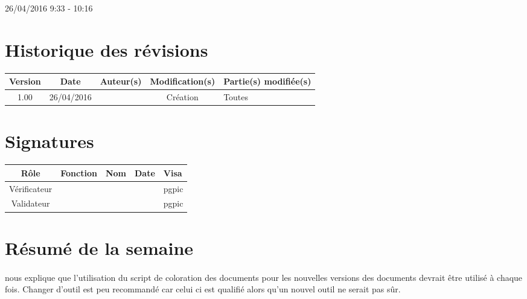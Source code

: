 \documentclass [a4paper] {article}
\begin{document}
\rhead{}

26/04/2016
\hfill   
\hfill 	9:33 - 10:16 				%



\section*{Historique des révisions}
\begin{center}
			\begin{tabular}{| c | c | c | c | p{4cm} |}
				\hline
				\rowcolor{Gray}
				Version & Date & Auteur(s) & Modification(s) & Partie(s) modifiée(s)		 \\
				\hline
				1.00 & 26/04/2016 & \Pierre & Création & Toutes \\
		\hline		
			\end{tabular}
		\end{center}

\section*{Signatures}

		\begin{center}
			\begin{tabular}{| c | c | c | c | p{4cm} |}
				\hline
				\rowcolor{Gray}
				Rôle & Fonction & Nom & Date & Visa		 \\
				\hline
				Vérificateur & \RQA & \Kafui &  & pgpic \\[30pt]
				\hline
				Validateur & \CP & \Sergi &  & pgpic \\[30pt]	
				\hline
			\end{tabular}
		\end{center}


\section{Résumé de la semaine}
\paragraph*{}
\nomTuteurQualite{} nous explique que l'utilisation du script de coloration des documents pour les nouvelles versions des documents devrait être utilisé à chaque fois. Changer d'outil est peu recommandé car celui ci est qualifié alors qu'un nouvel outil ne serait pas sûr.
\end{document}
